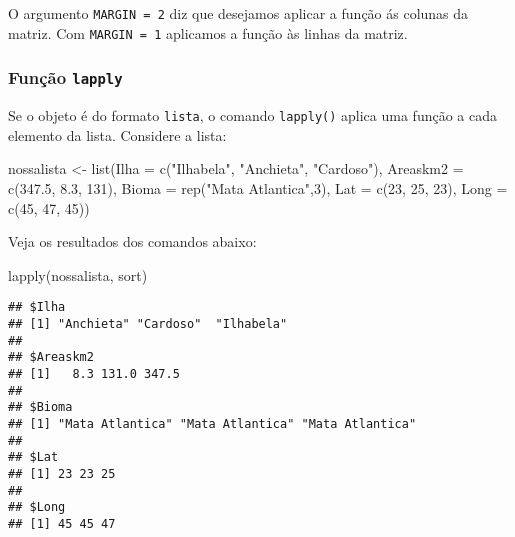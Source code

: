 \documentclass[
]{book}
\newenvironment{Shaded}{\begin{snugshade}}{\end{snugshade}}
\newcommand{\AttributeTok}[1]{\textcolor[rgb]{0.77,0.63,0.00}{#1}}
\newcommand{\DecValTok}[1]{\textcolor[rgb]{0.00,0.00,0.81}{#1}}
\newcommand{\FloatTok}[1]{\textcolor[rgb]{0.00,0.00,0.81}{#1}}
\newcommand{\FunctionTok}[1]{\textcolor[rgb]{0.00,0.00,0.00}{#1}}
\newcommand{\NormalTok}[1]{#1}
\newcommand{\OtherTok}[1]{\textcolor[rgb]{0.56,0.35,0.01}{#1}}
\newcommand{\StringTok}[1]{\textcolor[rgb]{0.31,0.60,0.02}{#1}}
\begin{document}
O argumento \texttt{MARGIN\ =\ 2} diz que desejamos aplicar a função ás colunas da matriz. Com \texttt{MARGIN\ =\ 1} aplicamos a função às linhas da matriz.

\hypertarget{funuxe7uxe3o-lapply}{%
\subsubsection*{\texorpdfstring{Função \texttt{lapply}}{Função lapply}}\label{funuxe7uxe3o-lapply}}

Se o objeto é do formato \texttt{lista}, o comando \texttt{lapply()} aplica uma função a cada elemento da lista. Considere a lista:

\begin{Shaded}
\begin{Highlighting}[]
\NormalTok{nossalista }\OtherTok{\textless{}{-}} \FunctionTok{list}\NormalTok{(}\AttributeTok{Ilha =} \FunctionTok{c}\NormalTok{(}\StringTok{"Ilhabela"}\NormalTok{, }\StringTok{"Anchieta"}\NormalTok{, }\StringTok{"Cardoso"}\NormalTok{), }
                  \AttributeTok{Areaskm2 =} \FunctionTok{c}\NormalTok{(}\FloatTok{347.5}\NormalTok{, }\FloatTok{8.3}\NormalTok{, }\DecValTok{131}\NormalTok{), }
                  \AttributeTok{Bioma =} \FunctionTok{rep}\NormalTok{(}\StringTok{"Mata Atlantica"}\NormalTok{,}\DecValTok{3}\NormalTok{),}
                  \AttributeTok{Lat =} \FunctionTok{c}\NormalTok{(}\DecValTok{23}\NormalTok{, }\DecValTok{25}\NormalTok{, }\DecValTok{23}\NormalTok{),}
                  \AttributeTok{Long =} \FunctionTok{c}\NormalTok{(}\DecValTok{45}\NormalTok{, }\DecValTok{47}\NormalTok{, }\DecValTok{45}\NormalTok{))}
\end{Highlighting}
\end{Shaded}

Veja os resultados dos comandos abaixo:

\begin{Shaded}
\begin{Highlighting}[]
\FunctionTok{lapply}\NormalTok{(nossalista, sort)}
\end{Highlighting}
\end{Shaded}

\begin{verbatim}
## $Ilha
## [1] "Anchieta" "Cardoso"  "Ilhabela"
## 
## $Areaskm2
## [1]   8.3 131.0 347.5
## 
## $Bioma
## [1] "Mata Atlantica" "Mata Atlantica" "Mata Atlantica"
## 
## $Lat
## [1] 23 23 25
## 
## $Long
## [1] 45 45 47
\end{verbatim}
\end{document}
